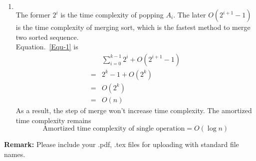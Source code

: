 \documentclass[12pt,a4paper]{article}
\makeatletter
\newtheorem*{solution}{Solution}
\theoremstyle{definition}
\renewenvironment{solution}[1][Solution] {\par\pushQED{\qed}\normalfont\topsep6\p@\@plus6\p@\relax\trivlist\item[\hskip\labelsep\bfseries#1\@addpunct{.}]\ignorespaces}{\popQED\endtrivlist\@endpefalse} \makeatother
\makeatother
\begin{document}
\begin{enumerate}
\begin{enumerate}
\begin{solution}
\begin{enumerate}
\begin{equation}
\begin{split}
        \end{split}
    \end{equation}
    The former $2^i$ is the time complexity of popping $A_i$. The later $O(2^{i+1}-1)$ is the time complexity of merging sort, which is the fastest method to merge two sorted sequence. 
    \\
    Equation.~\ref{Equ-1} is 
    \begin{equation}
        \begin{split}
            &\sum_{i=0}^{k-1} 2^i+O(2^{i+1}-1)\\
            =& 2^k-1+O(2^k)\\
            =& O(2^k)\\
            =& O(n)
        \end{split}
    \end{equation}
    As a result, the step of merge won't increase time complexity. The amortized time complexity remains 
    $$\text{Amortized time complexity of single operation}= O(\log n)$$ 
    
    \end{enumerate}
    \end{solution}
    \end{enumerate}
	
\end{enumerate}



\textbf{Remark:} Please include your .pdf, .tex files for uploading with standard file names.


\end{document}
